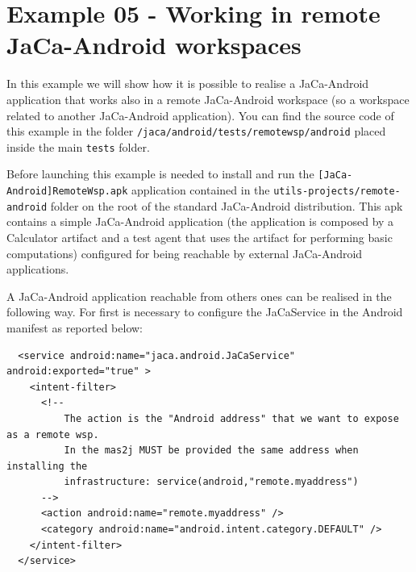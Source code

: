 \documentclass[11pt]{report}
\newcommand\labelsec[1]{\label{sec:#1}}
\newcommand\code[1]{{\mbox{\texttt{{#1}}}}}
\newcommand{\jacandroid}{\textsf{JaCa-Android}}
\begin{document}
\section{Example 05 - Working in remote \jacandroid{} workspaces}\labelsec{remotewsp-android}

In this example we will show how it is possible to realise a \jacandroid{} application that works also in a remote \jacandroid{} workspace (so a workspace related to another \jacandroid{} application). You can find the source code of this example in the folder \code{/jaca/android/tests/remotewsp/android} placed inside the main \code{tests} folder. 
%

Before launching this example is needed to install and run the \code{[JaCa-Android]RemoteWsp.apk} application contained in the \code{utils-projects/remote-android} folder on the root of the standard \jacandroid{} distribution. This apk contains a simple \jacandroid{} application (the application is composed by a \textsf{Calculator} artifact and a test agent that uses the artifact for performing basic computations) configured for being reachable by external \jacandroid{} applications. 


A \jacandroid{} application reachable from others ones can be realised in the following way. For first is necessary to configure the \textsf{JaCaService} in the Android manifest as reported below:

{\scriptsize \begin{verbatim}
  <service android:name="jaca.android.JaCaService" android:exported="true" >
    <intent-filter>
      <!-- 
          The action is the "Android address" that we want to expose as a remote wsp. 
          In the mas2j MUST be provided the same address when installing the 
          infrastructure: service(android,"remote.myaddress")
      -->
      <action android:name="remote.myaddress" />
      <category android:name="android.intent.category.DEFAULT" />
    </intent-filter>
  </service>
\end{verbatim}}
\end{document}

